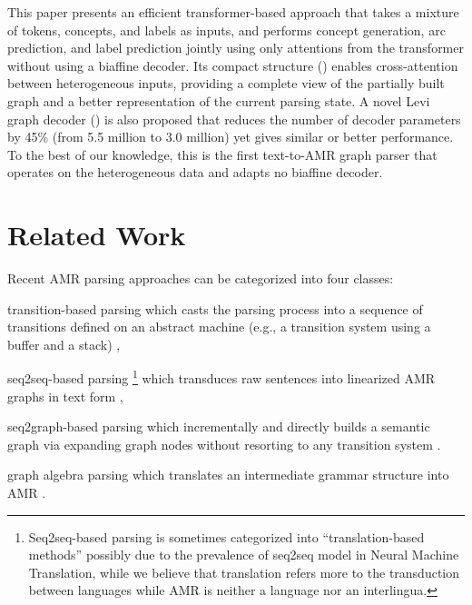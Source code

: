 \documentclass[11pt,a4paper]{article}
\begin{document}
This paper presents an efficient transformer-based \cite{vaswani2017attention} approach that takes a mixture of tokens, concepts, and labels as inputs, and performs concept generation, arc prediction, and label prediction jointly using only attentions from the transformer without using a biaffine decoder. Its compact structure () enables cross-attention between heterogeneous inputs, providing a complete view of the partially built graph and a better representation of the current parsing state.
A novel Levi graph decoder () is also proposed that reduces the number of decoder parameters by 45\% (from 5.5 million to 3.0 million) yet gives similar or better performance.
To the best of our knowledge, this is the first text-to-AMR graph parser that operates on the heterogeneous data and adapts no biaffine decoder.








%
 \section{Related Work}
\label{sec:related-work}

Recent AMR parsing approaches can be categorized into four classes:
\begin{inparaenum}[(i)]
\item transition-based parsing which casts the parsing process into a sequence of transitions defined on an abstract machine (e.g., a transition system using a buffer and a stack) \cite{wang-etal-2016-camr, damonte-etal-2017-incremental, ballesteros-al-onaizan-2017-amr, peng-etal-2017-addressing, guo-lu-2018-better, liu-etal-2018-amr, naseem-etal-2019-rewarding, fernandez-astudillo-etal-2020-transition, lee-etal-2020-pushing},
\item seq2seq-based parsing \footnote{Seq2seq-based parsing is sometimes categorized into ``translation-based methods'' \cite{koller-etal-2019-graph} possibly due to the prevalence of seq2seq model in Neural Machine Translation, while we believe that translation refers more to the transduction between languages while AMR is neither a language nor an interlingua. } which transduces raw sentences into linearized AMR graphs in text form \cite{barzdins-gosko-2016-riga, konstas-etal-2017-neural, van2017neural, peng-etal-2018-sequence, xu-etal-2020-improving, bevilacqua-etal-2021-one},
\item seq2graph-based parsing which incrementally and directly builds a semantic graph via expanding graph nodes without resorting to any transition system \cite{cai-lam-2019-core, zhang-etal-2019-broad, lyu2020differentiable}.
\item graph algebra parsing which translates an intermediate grammar structure into AMR \cite{artzi-etal-2015-broad, groschwitz-etal-2018-amr, lindemann-etal-2019-compositional, lindemann-etal-2020-fast}.
\end{inparaenum}  
\end{document}
